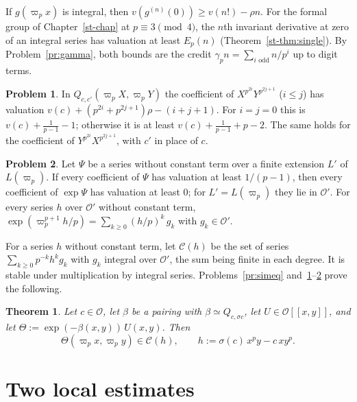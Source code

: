 \documentclass[reqno]{amsart}
\newcounter{chap}
\theoremstyle{definition}
\newtheorem{problem}{Problem}[section]
\theoremstyle{plain}
\newtheorem{theorem}{Theorem}[section]
\newcommand{\Oc}{\mathcal{O}}
\newcommand{\Cc}{\mathcal{C}}
\begin{document}
If \(g(\varpi_p x)\) is integral, then \(v(g^{(n)}(0)) \ge v(n!) - \rho n\).  For the formal group of Chapter~\ref{st-chap} at \(p \equiv 3 \pmod 4\), the \(n\)th invariant derivative at zero of an integral series has valuation at least \(E_p(n)\) (Theorem~\ref{st-thm:single}).  By Problem~\ref{pr:gamma}, both bounds are the credit \(\gamma_p n = \sum_{i \text{ odd}} n/p^i\) up to digit terms.

\begin{problem}\label{pr:rescaled}
In \(Q_{c,c'}(\varpi_p X, \varpi_p Y)\) the coefficient of \(X^{p^{2i}} Y^{p^{2j+1}}\) (\(i \le j\)) has valuation \(v(c) + (p^{2i} + p^{2j+1})\rho - (i+j+1)\).  For \(i = j = 0\) this is \(v(c) + \frac1{p-1} - 1\); otherwise it is at least \(v(c) + \frac{1}{p-1} + p - 2\).  The same holds for the coefficient of \(Y^{p^{2i}} X^{p^{2j+1}}\), with \(c'\) in place of \(c\).
\end{problem}

\begin{problem}\label{pr:exp-integral}
Let \(\Psi\) be a series without constant term over a finite extension \(L'\) of \(L(\varpi_p)\).  If every coefficient of \(\Psi\) has valuation at least \(1/(p-1)\), then every coefficient of \(\exp\Psi\) has valuation at least \(0\); for \(L' = L(\varpi_p)\) they lie in \(\Oc'\).  For every series \(h\) over \(\Oc'\) without constant term, \(\exp(\varpi_p^{p+1} h/p) = \sum_{k \ge 0} (h/p)^k\, g_k\) with \(g_k \in \Oc'\).
\end{problem}

For a series \(h\) without constant term, let \(\Cc(h)\) be the set of series \(\sum_{k \ge 0} p^{-k} h^k g_k\) with \(g_k\) integral over \(\Oc'\), the sum being finite in each degree.  It is stable under multiplication by integral series.  Problems~\ref{pr:simeq} and~\ref{pr:rescaled}--\ref{pr:exp-integral} prove the following.

\begin{theorem}\label{thm:class}
Let \(c \in \Oc\), let \(\beta\) be a pairing with \(\beta \simeq Q_{c,\sigma c}\), let \(U \in \Oc[[x,y]]\), and let \(\Theta := \exp(-\beta(x,y))\, U(x,y)\).  Then
\[
  \Theta(\varpi_p x, \varpi_p y) \in \Cc(h),
  \qquad
  h := \sigma(c)\, x^p y - c\, x y^p .
\]
\end{theorem}

\section{Two local estimates}\label{sec:estimates}
\end{document}
